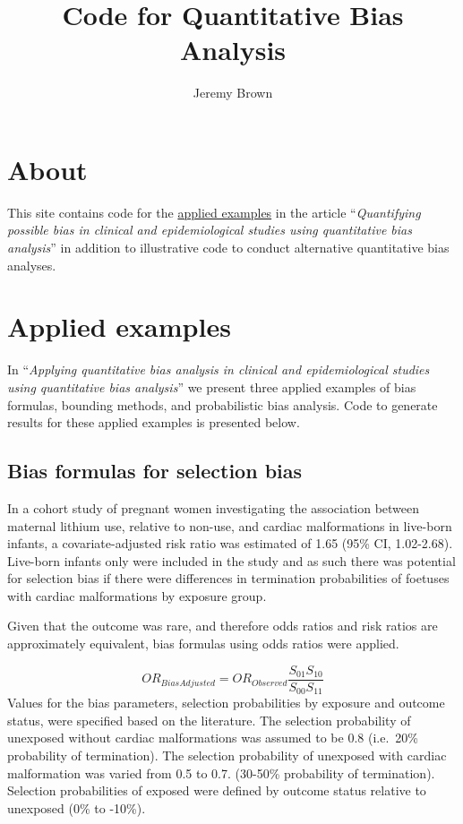 \documentclass[
]{book}
\title{Code for Quantitative Bias Analysis}
\author{Jeremy Brown}
\date{}
\begin{document}
\maketitle

{
\setcounter{tocdepth}{1}
\tableofcontents
}
\hypertarget{about}{%
\chapter{About}\label{about}}

This site contains code for the \protect\hyperlink{applied-examples}{applied examples} in the article ``\emph{Quantifying possible bias in clinical and epidemiological studies using quantitative bias analysis}'' in addition to illustrative code to conduct alternative quantitative bias analyses.

\hypertarget{applied-examples}{%
\chapter{Applied examples}\label{applied-examples}}

In ``\emph{Applying quantitative bias analysis in clinical and epidemiological studies using quantitative bias analysis}'' we present three applied examples of bias formulas, bounding methods, and probabilistic bias analysis. Code to generate results for these applied examples is presented below.

\hypertarget{bias-formulas-for-selection-bias}{%
\section{Bias formulas for selection bias}\label{bias-formulas-for-selection-bias}}

In a cohort study of pregnant women investigating the association between maternal lithium use, relative to non-use, and cardiac malformations in live-born infants, a covariate-adjusted risk ratio was estimated of 1.65 (95\% CI, 1.02-2.68).\citep{patorno2017lithium} Live-born infants only were included in the study and as such there was potential for selection bias if there were differences in termination probabilities of foetuses with cardiac malformations by exposure group.

Given that the outcome was rare, and therefore odds ratios and risk ratios are approximately equivalent, bias formulas using odds ratios were applied.\citep{greenland1996basic}

\[
OR_{BiasAdjusted} = OR_{Observed}\frac{S_{01}S_{10}}{S_{00}S_{11}}
\]
Values for the bias parameters, selection probabilities by exposure and outcome status, were specified based on the literature. The selection probability of unexposed without cardiac malformations was assumed to be 0.8 (i.e.~20\% probability of termination). The selection probability of unexposed with cardiac malformation was varied from 0.5 to 0.7. (30-50\% probability of termination). Selection probabilities of exposed were defined by outcome status relative to unexposed (0\% to -10\%).
\end{document}
